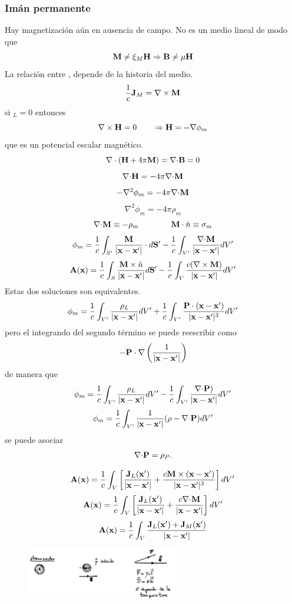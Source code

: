 \documentclass[10pt,oneside]{CBFT_book}
\begin{document}
\subsubsection{Imán permanente}

Hay magnetización  aún en ausencia de campo. No es un medio lineal de modo que
\[
	\vb{M}	 \neq \xi_M \vb{H} \Rightarrow \vb{B} \neq \mu \vb{H}
\]
La relación entre , depende de la historia del medio.
\[
	\frac{1}{c}\vb{J}_M = \rotorm{M}
\]
si $_L=0$ entonces 
\[
	\rotorm{H} = 0 \qquad \Rightarrow \vb{H} = -\Nabla\phi_m
\]
que es un potencial escalar magnético.
\[
	\Nabla\cdot( \vb{H} + 4\pi\vb{M} ) = \divem{B} = 0
\]
\[
	\mathbf{\nabla}\mathbf{\cdot}\mathbf{H} = -4\pi\mathbf{\nabla}\mathbf{\cdot}\mathbf{M}
\]
\[
	-\nabla^2 \phi_m = -4\pi\mathbf{\nabla}\mathbf{\cdot}\mathbf{M}
\]
\[
	\nabla^2 \phi_m = -4\pi\rho_m
\]
\[
	\divem{M} \equiv -\rho_m \qquad \qquad \vb{M}\cdot\hat{n} \equiv \sigma_m
\]
\[
	\phi_m = \frac{1}{c} \int_{S'} \frac{\vb{M}}{|\vb{x}-\vb{x}'|} \cdot d\vb{S}' -
		\frac{1}{c} \int_{V'} \frac{\divem{M}}{|\vb{x}-\vb{x}'|} dV' 
\]
\[
	\vb{A}( \vb{x}) = \frac{1}{c} \int_S \frac{ \vb{M}\times\hat{n} }{|\vb{x}-\vb{x}'|} d\vb{S}' - 
		\frac{1}{c} \int_V \frac{ c(\rotorm{M}) }{|\vb{x}-\vb{x}'|}  dV'
\]
Estas dos soluciones son equivalentes.
\[
	\phi_m = \frac{1}{c} \int_{V'} \frac{\rho_L}{|\vb{x}-\vb{x}'|}  dV' +
		\frac{1}{c} \int_{V'} \frac{ \vb{P}\cdot(\vb{x}-\vb{x}')}{|\vb{x}-\vb{x}'|^3} dV' 
\]
pero el integrando del segundo término se puede reescribir como 
\[
	-\vb{P}\cdot\Nabla\left(\frac{1}{|\vb{x}-\vb{x}'|}\right)
\]
de manera que 
\[
	\phi_m = \frac{1}{c} \int_{V'} \frac{\rho_L}{|\vb{x}-\vb{x}'|}  dV' -
		\frac{1}{c} \int_{V'} \frac{ \divem{P}) }{|\vb{x}-\vb{x}'|} dV' 
\]
\[
	\phi_m = \frac{1}{c} \int_{V'} \frac{1}{|\vb{x}-\vb{x}'|}( \rho - \divem{P} )  dV'
\]
se puede asociar
\[
	\mathbf{\nabla}\mathbf{\cdot}\mathbf{P} = \rho_P.
\]

\[
	\vb{A}( \vb{x}) = \frac{1}{c} \int_V \left[ \frac{ \vb{J}_L(\vb{x}') }{|\vb{x}-\vb{x}'|} +
		\frac{ c \vb{M} \times (\vb{x}-\vb{x}') }{|\vb{x}-\vb{x}'|^3} \right] dV'
\]
\[
	\vb{A}( \vb{x}) = \frac{1}{c} \int_V \left[ \frac{ \vb{J}_L(\vb{x}') }{|\vb{x}-\vb{x}'|} +
		\frac{ c \divem{M} }{|\vb{x}-\vb{x}'|} \right] dV'
\]
\[
	\vb{A}( \vb{x}) = \frac{1}{c} \int_V \frac{ \vb{J}_L(\vb{x}') + \vb{J}_M(\vb{x}' ) }{|\vb{x}-\vb{x}'|}	
\]

\begin{figure}[htb]
	\begin{center}
	\includegraphics[width=0.6\textwidth]{images/fig_ft1_magnetizaciones.pdf}	 
	\end{center}
	\caption{}
\end{figure}
\end{document}
